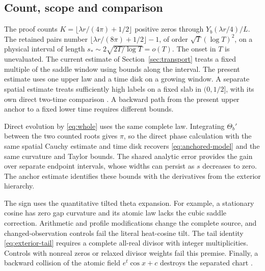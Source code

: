 \subsection{Count, scope and comparison}
The proof counts \(K=\lfloor\lambda r/(4\pi)+1/2\rfloor\) positive zeros
through \(Y_b(\lambda r/4)/L\). The retained pairs number
\(\lfloor\lambda r/(8\pi)+1/2\rfloor-1\), of order
\(\sqrt{T}(\log T)^2\), on a physical interval of length
\(s_*\sim2\sqrt{2T/\log T}=o(T)\). The onset in \(T\) is unevaluated.
The current estimate of Section~\ref{sec:transport} treats a fixed multiple
of the saddle window using bounds along the interval. The present estimate
uses one upper law and a time disk on a growing window. A separate spatial
estimate treats sufficiently high labels on a fixed slab in \((0,1/2]\),
with its own direct two-time comparison \cite[\S5 and references there]{EZCurvature}.
A backward path from the present upper anchor to a fixed lower time
requires different bounds.

Direct evolution by \eqref{eq:whole} uses the same complete law. Integrating
\(\Theta_b'\) between the two counted roots gives \(\pi\), so the direct
phase calculation with the same spatial Cauchy estimate and time disk
recovers \eqref{eq:anchored-model} and the same curvature and Taylor
bounds. The shared analytic error provides the gain over separate endpoint
intervals, whose widths can persist as \(s\) decreases to zero.
The anchor estimate identifies these bounds with the derivatives from
the exterior hierarchy.

The sign uses the quantitative tilted theta expansion. For example, a
stationary cosine has zero gap curvature and its atomic law lacks the cubic
saddle correction. Arithmetic and profile modifications change the complete
source, and changed-observation controls fail the literal heat-cosine tilt.
The tail identity \eqref{eq:exterior-tail} requires a complete all-real
divisor with integer multiplicities. Controls with nonreal zeros or relaxed
divisor weights fail this premise. Finally, a backward collision of the
atomic field \(e^t\cos x+c\) destroys the separated chart
\cite[\S5 and references there]{EZCurvature}.
